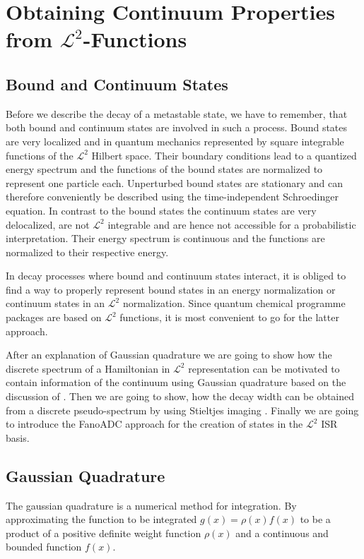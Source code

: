 \chapter{Obtaining Continuum Properties from $\mathcal{L}^2$-Functions}


\section{Bound and Continuum States}
Before we describe the decay of a metastable state, we have to remember,
that both bound and continuum states are involved in such a process.
Bound states are very localized and in quantum mechanics
represented by square integrable
functions of the $\mathcal{L}^2$ Hilbert space. Their boundary conditions
lead to a quantized energy spectrum and the functions of the bound states
are normalized
to represent one particle each. Unperturbed bound states are stationary
and can therefore conveniently be described using the time-independent
Schroedinger equation.
In contrast to the bound states the
continuum states are very delocalized, are not $\mathcal{L}^2$
integrable and are hence not accessible for a probabilistic interpretation.
Their energy spectrum is continuous and the functions are normalized to
their respective energy.

In decay processes
where bound and continuum states interact, it is obliged to find a way to
properly represent bound states in an energy normalization or continuum states
in an $\mathcal{L}^2$ normalization.
Since quantum chemical programme packages are based on $\mathcal{L}^2$ functions,
it is most convenient to go for the latter approach.

After an explanation of Gaussian quadrature we are going to show how
the discrete spectrum of a Hamiltonian in $\mathcal{L}^2$ representation
can be motivated to contain information of the continuum using Gaussian quadrature
based on the discussion of \cite{Reinhardt79}.
Then we are going to show, how the decay width can be obtained from a
discrete pseudo-spectrum by using Stieltjes imaging \cite{Stieltjes}.
Finally we are going to introduce the FanoADC approach for the creation of
states in the $\mathcal{L^2}$ \ac{ISR} basis.



\section{Gaussian Quadrature}
The gaussian quadrature is a numerical method for integration. By approximating
the function to be integrated $g(x) = \rho(x) f(x)$ to be a product of a
positive definite weight
function $\rho (x)$ and a continuous and bounded function $f(x)$.

